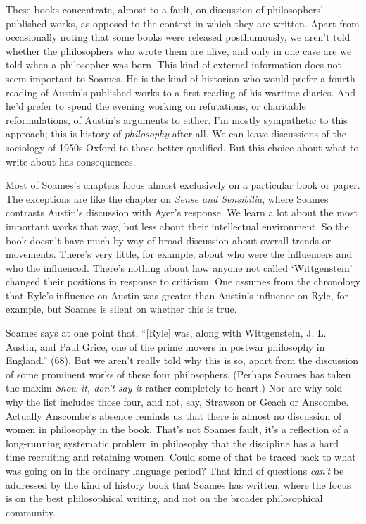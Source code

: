 \documentclass[
  11pt,
  letterpaper,
  DIV=11,
  numbers=noendperiod,
  twoside]{scrartcl}
\begin{document}
These books concentrate, almost to a fault, on discussion of
philosophers' published works, as opposed to the context in which they
are written. Apart from occasionally noting that some books were
released posthumously, we aren't told whether the philosophers who wrote
them are alive, and only in one case are we told when a philosopher was
born. This kind of external information does not seem important to
Soames. He is the kind of historian who would prefer a fourth reading of
Austin's published works to a first reading of his wartime diaries. And
he'd prefer to spend the evening working on refutations, or charitable
reformulations, of Austin's arguments to either. I'm mostly sympathetic
to this approach; this is history of \emph{philosophy} after all. We can
leave discussions of the sociology of 1950s Oxford to those better
qualified. But this choice about what to write about has consequences.

Most of Soames's chapters focus almost exclusively on a particular book
or paper. The exceptions are like the chapter on \emph{Sense and
Sensibilia}, where Soames contrasts Austin's discussion with Ayer's
response. We learn a lot about the most important works that way, but
less about their intellectual environment. So the book doesn't have much
by way of broad discussion about overall trends or movements. There's
very little, for example, about who were the influencers and who the
influenced. There's nothing about how anyone not called `Wittgenstein'
changed their positions in response to criticism. One assumes from the
chronology that Ryle's influence on Austin was greater than Austin's
influence on Ryle, for example, but Soames is silent on whether this is
true.

Soames says at one point that, ``{[}Ryle{]} was, along with
Wittgenstein, J. L. Austin, and Paul Grice, one of the prime movers in
postwar philosophy in England.'' (68). But we aren't really told why
this is so, apart from the discussion of some prominent works of these
four philosophers. (Perhaps Soames has taken the maxim \emph{Show it,
don't say it} rather completely to heart.) Nor are why told why the list
includes those four, and not, say, Strawson or Geach or Anscombe.
Actually Anscombe's absence reminds us that there is almost no
discussion of women in philosophy in the book. That's not Soames fault,
it's a reflection of a long-running systematic problem in philosophy
that the discipline has a hard time recruiting and retaining women.
Could some of that be traced back to what was going on in the ordinary
language period? That kind of questions \emph{can't} be addressed by the
kind of history book that Soames has written, where the focus is on the
best philosophical writing, and not on the broader philosophical
community.
\end{document}
